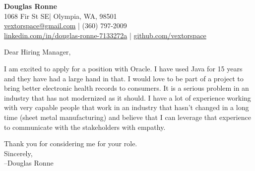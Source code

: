 \documentclass[letter,12pt]{article}
\begin{document}
\begin{center}
    {\Huge \textbf{Douglas Ronne}}\\
    \vspace{2mm}
    1068 Fir St SE| Olympia, WA, 98501\\
    \href{mailto:vextorspace@gmail.com}{vextorspace@gmail.com} | (360) 797-2009\\
    \href{www.linkedin.com/in/douglas-ronne-7133272a}{linkedin.com/in/douglas-ronne-7133272a} | \href{https://github.com/vextorspace}{github.com/vextorspace}
\end{center}

Dear Hiring Manager,

I am excited to apply for a position with Oracle. I have used Java for 15 years and they have had a large hand in that. I would love to be part of a project to bring better electronic health records to consumers. It is a serious problem in an industry that has not modernized as it should. I have a lot of experience working with very capable people that work in an industry that hasn't changed in a long time (sheet metal manufacturing) and believe that I can leverage that experience to communicate with the stakeholders with empathy.

Thank you for considering me for your role.
\\
Sincerely,\\
--Douglas Ronne
\end{document}
